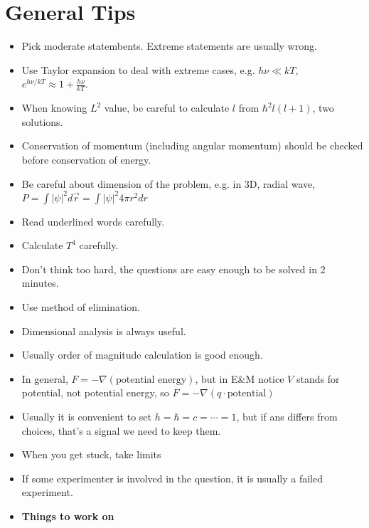 \documentclass[12pt,a4paper]{book}
\begin{document}
\section*{General Tips}
\begin{itemize}
\item Pick moderate statembents. Extreme statements are usually wrong.
\item Use Taylor expansion to deal with extreme cases, e.g. $h\nu\ll kT$,
$e^{h\nu/kT}\approx1+\frac{h\nu}{kT}$.
\item When knowing $L^{2}$ value, be careful to calculate $l$ from $\hbar^{2}l(l+1)$,
two solutions.
\item Conservation of momentum (including angular momentum) should be checked
before conservation of energy.
\item Be careful about dimension of the problem, e.g. in 3D, radial wave,
$P=\int|\psi|^{2}d\vec{r}=\int|\psi|^{2}4\pi r^{2}dr$
\item Read underlined words carefully.
\item Calculate $T^{4}$ carefully.
\item Don't think too hard, the questions are easy enough to be solved in
2 minutes.
\item Use method of elimination.
\item Dimensional analysis is always useful.
\item Usually order of magnitude calculation is good enough.
\item In general, $F=-\nabla(\text{potential energy})$, but in E\&M notice
$V$ stands for potential, not potential energy, so $F=-\nabla(q\cdot\text{potential})$
\item Usually it is convenient to set $h=\hbar=c=\cdots=1$, but if ans
differs from choices, that's a signal we need to keep them.
\item When you get stuck, take limits
\item If some experimenter is involved in the question, it is usually a
failed experiment.
\item \textbf{Things to work on}

\end{itemize}
\end{document}
